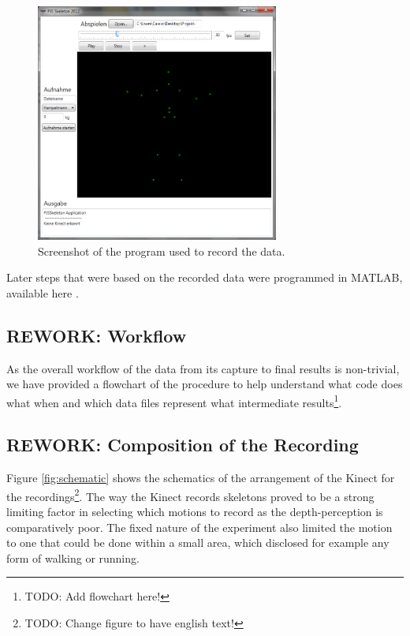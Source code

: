 \documentclass[a4paper]{article}
\begin{document}
\begin{figure}[H]
	\centering
	\includegraphics[width=8cm]{programm.jpg}
	\caption{Screenshot of the program used to record the data.}
	\label{fig:programm}
\end{figure}

Later steps that were based on the recorded data were programmed in MATLAB, available here \cite{matlabprograms}.

\subsection{REWORK: Workflow}

As the overall workflow of the data from its capture to final results is non-trivial, we have provided a flowchart of the procedure to help understand what code does what when and which data files represent what intermediate results\footnote{TODO: Add flowchart here!}.

\subsection{REWORK: Composition of the Recording}

Figure \ref{fig:schematic} shows the schematics of the arrangement of the Kinect for the recordings\footnote{TODO: Change figure to have english text!}.
The way the Kinect records skeletons proved to be a strong limiting factor in selecting which motions to record as the depth-perception is comparatively poor.
The fixed nature of the experiment also limited the motion to one that could be done within a small area, which disclosed for example any form of walking or running.
\end{document}
